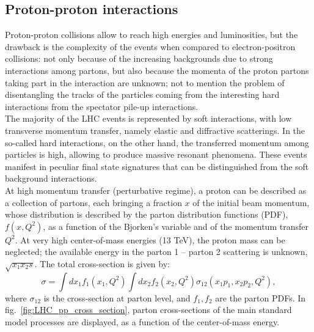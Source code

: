 \subsection{Proton-proton interactions}
\noindent Proton-proton collisions allow to reach high energies and luminosities, but the drawback is the complexity of the events when compared to electron-positron collisions: not only because of the increasing backgrounds due to strong interactions among partons, but also because the momenta of the proton partons taking part in the interaction are unknown; not to mention the problem of disentangling the tracks of the particles coming from the interesting hard interactions from the spectator pile-up interactions.\\
The majority of the LHC events is represented by soft interactions, with low transverse momentum transfer, namely elastic and diffractive scatterings. In the so-called hard interactions, on the other hand, the transferred momentum among particles is high, allowing to produce massive resonant phenomena. These events manifest in peculiar final state signatures that can be distinguished from the soft background interactions.\\
At high momentum transfer (perturbative regime), a proton can be described as a collection of partons, each bringing a fraction $x$ of the initial beam momentum, whose distribution is described by the parton distribution functions (PDF), $f(x,Q^2)$, as a function of the Bjorken's variable and of the momentum transfer $Q^2$. At very high center-of-mass energies (13 TeV), the proton mass can be neglected; the available energy in the parton 1 -- parton 2 scattering is unknown, $\sqrt{x_1 x_2 s}$. The total cross-section is given by:
\begin{equation}
\sigma = \int dx_1 f_1(x_1,Q^2) \int dx_2 f_2(x_2,Q^2) \sigma_{12}(x_1 p_1, x_2 p_2, Q^2),
\end{equation}
where $\sigma_{12}$ is the cross-section at parton level, and $f_1,f_2$ are the parton PDFs. In fig.~\ref{fig:LHC_pp_cross_section}, parton cross-sections of the main standard model processes are displayed, as a function of the center-of-mass energy.

